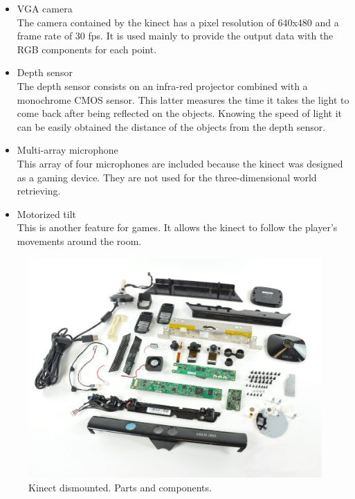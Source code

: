 \begin{itemize}
	\item{VGA camera}\\
	The camera contained by the kinect has a pixel resolution of 640x480 and a frame rate of 30 fps. It is used mainly to provide the output data with the RGB components for each point. 
	
	\item{Depth sensor}\\
	The depth sensor consists on an infra-red projector combined with a monochrome CMOS sensor. This latter measures the time it takes the light to come back after being reflected on the objects. Knowing the speed of light it can be easily obtained the distance of the objects from the depth sensor. 

	\item{Multi-array microphone}\\
	This array of four microphones are included because the kinect was designed as a gaming device. They are not used for the three-dimensional world retrieving. 
	
	\item{Motorized tilt}\\
	This is another feature for games. It allows the kinect to follow the player's movements around the room. \cite{howkinectworks}
\end{itemize}



\begin{figure}[h]
	\begin{center}
	\includegraphics[scale=0.2]{img/kinect/kinect_parts.eps}
	\caption[Kinect Parts]{Kinect dismounted. Parts and components.}
	\end{center}

\end{figure}


